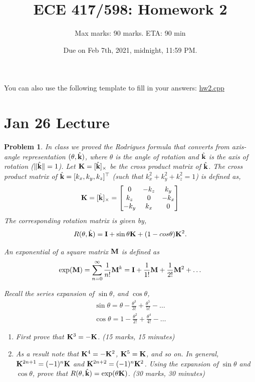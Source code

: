 \documentclass[twocolumn]{article}
\title{ECE 417/598: Homework 2}
\author{Max marks: 90 marks. ETA: 90 min}
\date{Due on Feb 7th, 2021, midnight, 11:59 PM.}
\newtheorem{prob}{Problem}
\newif\ifsol
\begin{document}
\maketitle

You can also use the following template to fill in your answers: \href{https://vikasdhiman.info/ECE417-Mobile-Robots/hw/hw2/code/hw2.cpp}{hw2.cpp}

\section{Jan 26 Lecture}

\begin{prob}
  In class we proved the Rodrigues formula that converts from axis-angle
  representation $(\theta, \hat{\mathbf{k}})$, where $\theta$ is the angle of rotation
  and $\hat{\mathbf{k}}$ is the axis of rotation ($\|\hat{\mathbf{k}}\| = 1$). Let $\mathbf{K} = [\hat{\mathbf{k}}]_{\times}$ be
  the cross product matrix of $\hat{\mathbf{k}}$. The cross product matrix
  of $\hat{\mathbf{k}} = [k_x, k_y, k_z]^\top$ (such that $k_x^2 + k_y^2 + k_z^2 = 1$) is defined as,
    \begin{align}
      \mathbf{K} = [\hat{\mathbf{k}}]_{\times} = \begin{bmatrix}
        0 & -k_z & k_y \\
        k_z & 0 & -k_x \\
        -k_y & k_x & 0
      \end{bmatrix}
    \end{align}
  The corresponding rotation matrix is
  given by,
  \begin{align}
    R(\theta, \hat{\mathbf{k}}) = \mathbf{I} + \sin \theta \mathbf{K} + (1-cos \theta) \mathbf{K}^2.
  \end{align}

  An exponential of a square matrix $\mathbf{M}$ is defined as
  \begin{align}
    \exp(\mathbf{M}) = \sum_{n=0}^\infty \frac{1}{n!} \mathbf{M}^k = \mathbf{I} + \frac{1}{1!}\mathbf{M} + \frac{1}{2!}\mathbf{M}^2 + \dots
  \end{align}

  Recall the series expansion of $\sin \theta$, and $\cos \theta$,
  \begin{align}
    \sin \theta = \theta - \frac{\theta^3}{3!} + \frac{\theta^5}{5!} - \dots
    \\
    \cos \theta = 1 - \frac{\theta^2}{2!} + \frac{\theta^4}{4!} - \dots
  \end{align}

  \begin{enumerate}
  \item First prove that $\mathbf{K}^3 = - \mathbf{K}$. (15 marks, 15 minutes)
  \item As a result note that $\mathbf{K}^4 = - \mathbf{K}^2$, $\mathbf{K}^5 = \mathbf{K}$, and so on.
    In general, $\mathbf{K}^{2n+1} =
    (-1)^n\mathbf{K}$ and $\mathbf{K}^{2n+2} = (-1)^n\mathbf{K}^2$. Using the expansion of $\sin\theta$ and $\cos\theta$, prove that
    $R(\theta, \hat{\mathbf{k}}) = \exp(\theta \mathbf{K})$. (30 marks, 30 minutes)
  \end{enumerate}
\end{prob}
\ifsol
\end{document}
